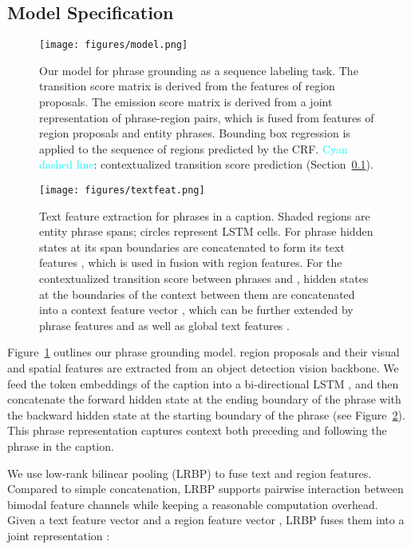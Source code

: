 \documentclass[11pt,a4paper]{article}
\begin{document}
\subsection{Model Specification}
\label{ssec:model}

\begin{figure}[t]
    \centering
    \texttt{[image: figures/model.png]}
    \caption{Our model for phrase grounding as a sequence labeling task. The  transition score matrix is derived from the features of  region proposals. The  emission score matrix is derived from a joint representation of phrase-region pairs, which is fused from features of region proposals and  entity phrases. Bounding box regression is applied to the sequence of regions predicted by the CRF. \textcolor{cyan}{Cyan dashed line}: contextualized transition score prediction (Section~\ref{ssec:model}). }
    \label{fig:model}
\end{figure}

\begin{figure}[t]
    \centering
    \texttt{[image: figures/textfeat.png]}
    \caption{Text feature extraction for phrases in a caption. Shaded regions are entity phrase spans; circles represent LSTM cells. For phrase  hidden states at its span boundaries are concatenated to form its text features , which is used in fusion with region features. For the contextualized transition score between phrases  and , hidden states at the boundaries of the context between them are concatenated into a context feature vector , which can be further extended by phrase features  and  as well as global text features . }
    \label{fig:textfeat}
\end{figure}

Figure~\ref{fig:model} outlines our phrase grounding model.  region proposals and their visual and spatial features are extracted from an object detection vision backbone. We feed the token embeddings of the caption into a bi-directional LSTM \cite{DBLP:journals/neco/HochreiterS97}, and then concatenate the forward hidden state at the ending boundary of the phrase with the backward hidden state at the starting boundary of the phrase (see Figure~\ref{fig:textfeat}). This phrase representation captures context both preceding and following the phrase in the caption. 

We use low-rank bilinear pooling (LRBP) \cite{DBLP:conf/iclr/KimOLKHZ17} to fuse text and region features. Compared to simple concatenation, LRBP supports pairwise interaction between bimodal feature channels while keeping a reasonable computation overhead. Given a text feature vector  and a region feature vector , LRBP fuses them into a joint representation : 
\end{document}
